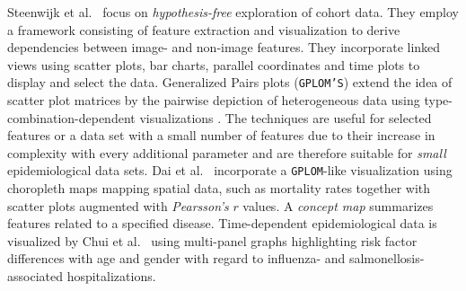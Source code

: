 \documentclass[journal]{style/vgtc} 			          %
\begin{document}
Steenwijk et al.~\cite{Steenwijk} focus on \emph{hypothesis-free} exploration of cohort data.
They employ a framework consisting of feature extraction and visualization to derive dependencies between image- and non-image features.
They incorporate linked views using scatter plots, bar charts, parallel coordinates and time plots to display and select the data.
Generalized Pairs plots (\texttt{GPLOM'S}) extend the idea of scatter plot matrices by the pairwise depiction of heterogeneous data using type-combination-dependent visualizations \cite{GPLOMS, Francois2013}.
The techniques are useful for selected features or a data set with a small number of features due to their increase in complexity with every additional parameter and are therefore suitable for \emph{small} epidemiological data sets.
Dai et al.~\cite{Dai2005} incorporate a \texttt{GPLOM}-like visualization using choropleth maps mapping spatial data, such as mortality rates together with scatter plots augmented with \emph{Pearsson's} $r$ values.
A \emph{concept map} summarizes features related to a specified disease.
Time-dependent epidemiological data is visualized by Chui et al.~\cite{Chui2011} using multi-panel graphs highlighting risk factor differences with age and gender with regard to influenza- and salmonellosis-associated hospitalizations.
\end{document}
